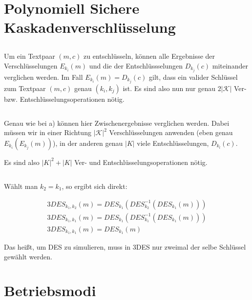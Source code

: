 \documentclass{../crypto}
\date{30. Oktober 2015}
\begin{document}
\maketitle

\section{Polynomiell Sichere Kaskadenverschlüsselung}

\subsection{}
Um ein Textpaar $(m ,c)$ zu entschlüsseln, können alle Ergebnisse der Verschlüsselungen $E_{k_i}(m)$ 
und die der Entschlüssselungen $D_{k_j}(c)$ miteinander verglichen werden. Im Fall $E_{k_i}(m)=D_{k_j}(c)$
gilt, dass ein valider Schlüssel zum Textpaar $(m, c)$ genau $(k_i, k_j)$ ist.
Es sind also nun nur genau $2|\mathcal{K}|$ Ver- bzw. Entschlüsselungsoperationen nötig.

\subsection{}
Genau wie bei a) können hier Zwischenergebnisse verglichen werden. Dabei müssen wir in einer
Richtung $|\mathcal{K}|^2$ Verschlüsselungen anwenden (eben genau $E_{k_i}(E_{k_j}(m))$), in der anderen genau 
$|K|$ viele Entschlüsselungen, $D_{k_l}(c)$.

Es sind also $|K|^2+|K|$ Ver- und Entschlüsselungsoperationen nötig.

\subsection{}
Wählt man $k_2=k_1$, so ergibt sich direkt:

\begin{align*}
    3DES_{k_1,k_2}(m) = DES_{k_1}\left(DES_{k_2}^{-1}\left(DES_{k_1}(m)\right)\right) \\
    3DES_{k_1,k_1}(m) = DES_{k_1}\left(DES_{k_1}^{-1}\left(DES_{k_1}(m)\right)\right) \\
    3DES_{k_1,k_1}(m) = DES_{k_1}\left(m\right)
\end{align*}

Das heißt, um DES zu simulieren, muss in 3DES nur zweimal der selbe Schlüssel gewählt werden.

\section{Betriebsmodi}
\end{document}
